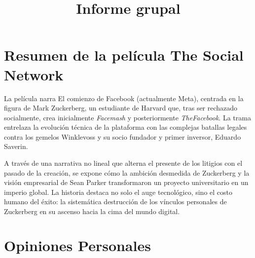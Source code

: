 \documentclass{./plantilla/umss}
\title{Informe grupal}
\begin{document}

\fairemarges
\fairepagedegarde

\section{Resumen de la película The Social Network}

La película narra El comienzo de Facebook (actualmente Meta), centrada en la figura de Mark Zuckerberg, un estudiante de Harvard que, tras ser rechazado socialmente, crea inicialmente \textit{Facemash} y posteriormente \textit{TheFacebook}. La trama entrelaza la evolución técnica de la plataforma con las complejas batallas legales contra los gemelos Winklevoss y su socio fundador y primer inversor, Eduardo Saverin. 

A través de una narrativa no lineal que alterna el presente de los litigios con el pasado de la creación, se expone cómo la ambición desmedida de Zuckerberg y la visión empresarial de Sean Parker transformaron un proyecto universitario en un imperio global. La historia destaca no solo el auge tecnológico, sino el costo humano del éxito: la sistemática destrucción de los vínculos personales de Zuckerberg en su ascenso hacia la cima del mundo digital.

\section{Opiniones Personales}
\end{document}
